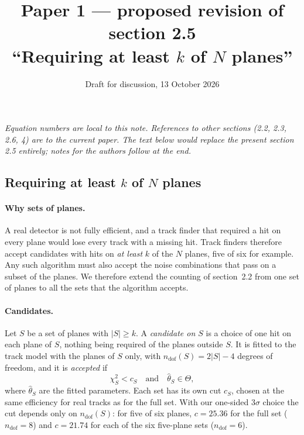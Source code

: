 \documentclass[a4paper,11pt]{article}
\title{Paper 1 --- proposed revision of section 2.5\\[0.3ex]
\large ``Requiring at least $k$ of $N$ planes''}
\author{Draft for discussion, 13 October 2026}
\date{}
\newcommand{\ndof}{n_\mathrm{dof}}
\begin{document}
\maketitle

\noindent\textit{Equation numbers are local to this note. References to other sections
(2.2, 2.3, 2.6, 4) are to the current paper. The text below would replace the present
section 2.5 entirely; notes for the authors follow at the end.}

\subsection{Requiring at least $k$ of $N$ planes}\label{sec:kofn}

\paragraph{Why sets of planes.} A real detector is not fully efficient, and a track finder
that required a hit on every plane would lose every track with a missing hit. Track finders
therefore accept candidates with hits on \emph{at least} $k$ of the $N$ planes, five of six
for example. Any such algorithm must also accept the noise combinations that pass on a subset
of the planes. We therefore extend the counting of section~2.2 from one set of planes to all
the sets that the algorithm accepts.

\paragraph{Candidates.} Let $S$ be a set of planes with $|S|\ge k$. A \emph{candidate on $S$}
is a choice of one hit on each plane of $S$, nothing being required of the planes outside
$S$. It is fitted to the track model with the planes of $S$ only, with
$\ndof(S)=2|S|-4$ degrees of freedom, and it is \emph{accepted} if
\begin{equation}
  \chi^2_S < c_S \quad\text{and}\quad \hat\theta_S\in\Theta ,
  \label{eq:accept}
\end{equation}
where $\hat\theta_S$ are the fitted parameters. Each set has its own cut $c_S$, chosen at the
same efficiency for real tracks as for the full set. With our one-sided $3\sigma$ choice the
cut depends only on $\ndof(S)$: for five of six planes, $c=25.36$ for the full set
($\ndof=8$) and $c=21.74$ for each of the six five-plane sets ($\ndof=6$).
\end{document}
